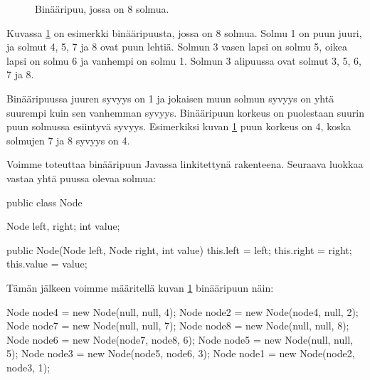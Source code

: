 \begin{figure}
\center
{}
\caption{Binääripuu, jossa on 8 solmua.}
\label{fig:binpuu}
\end{figure}

Kuvassa \ref{fig:binpuu} on esimerkki binääripuusta, jossa on 8 solmua.
Solmu 1 on puun juuri, ja solmut 4, 5, 7 ja 8 ovat puun lehtiä.
Solmun 3 vasen lapsi on solmu 5, oikea lapsi on solmu 6
ja vanhempi on solmu 1.
Solmun 3 alipuussa ovat solmut 3, 5, 6, 7 ja 8.

Binääripuussa juuren syvyys on 1 ja jokaisen muun solmun syvyys on yhtä
suurempi kuin sen vanhemman syvyys.
Binääripuun korkeus on puolestaan suurin puun solmussa
esiintyvä syvyys.
Esimerkiksi kuvan \ref{fig:binpuu} puun korkeus on 4,
koska solmujen 7 ja 8 syvyys on 4.

Voimme toteuttaa binääripuun Javassa linkitettynä rakenteena.
Seuraava luokkaa vastaa yhtä puussa olevaa solmua:

\begin{code}
public class Node {
    Node left, right;
    int value;

    public Node(Node left, Node right, int value) {
        this.left = left;
        this.right = right;
        this.value = value;
    }
}
\end{code}

Tämän jälkeen voimme määritellä kuvan \ref{fig:binpuu}
binääripuun näin:

\begin{code}
Node node4 = new Node(null, null, 4);
Node node2 = new Node(node4, null, 2);
Node node7 = new Node(null, null, 7);
Node node8 = new Node(null, null, 8);
Node node6 = new Node(node7, node8, 6);
Node node5 = new Node(null, null, 5);
Node node3 = new Node(node5, node6, 3);
Node node1 = new Node(node2, node3, 1);
\end{code}

